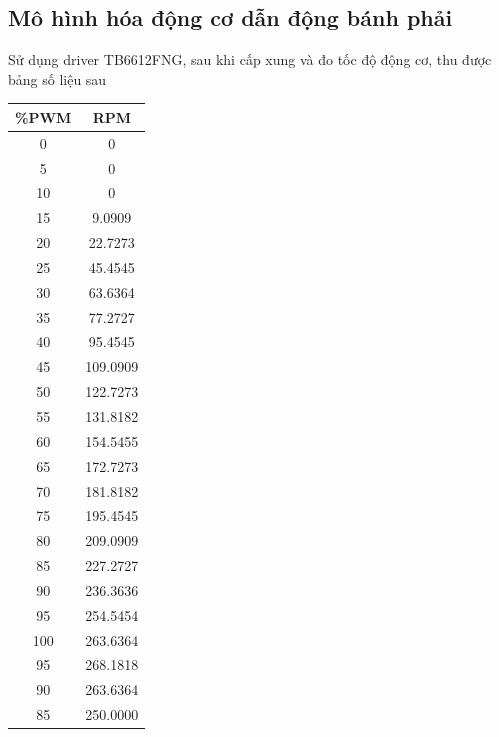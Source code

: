           \subsection{Mô hình hóa động cơ dẫn động bánh phải}    
               \hspace*{0.6cm}Sử dụng driver TB6612FNG, sau khi cấp xung và đo tốc độ động cơ, thu được bảng số liệu sau
               \begin{table}[h!]
                    \centering
                    \begin{tabular}{|c|c|}
                         \hline
                         \textbf{\%PWM} & \textbf{RPM} \\
                         \hline
                         0 & 0 \\
                         5 & 0 \\
                         10 & 0 \\
                         15 & 9.0909 \\
                         20 & 22.7273 \\
                         25 & 45.4545 \\
                         30 & 63.6364 \\
                         35 & 77.2727 \\
                         40 & 95.4545 \\
                         45 & 109.0909 \\
                         50 & 122.7273 \\
                         55 & 131.8182 \\
                         60 & 154.5455 \\
                         65 & 172.7273 \\
                         70 & 181.8182 \\
                         75 & 195.4545 \\
                         80 & 209.0909 \\
                         85 & 227.2727 \\
                         90 & 236.3636 \\
                         95 & 254.5454 \\
                         100 & 263.6364 \\
                         95 & 268.1818 \\
                         90 & 263.6364 \\
                         85 & 250.0000 \\

\end{tabular}
\end{table}
